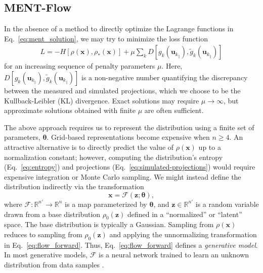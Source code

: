 \documentclass[%
    reprint,
    twocolumn,
    nofootinbib,
    amsmath,
    amssymb,
    aps,
    prstab,
]{revtex4-2}
\newcommand{\vect}[1]{\boldsymbol{\mathbf{#1}}}
\begin{document}
\subsection{MENT-Flow} \label{subsec:ment-flow}

In the absence of a method to directly optimize the Lagrange functions in Eq.~\eqref{eq:ment_solution}, we may try to minimize the loss function
%
\begin{multline}\label{eq:loss}
    L = 
    - H[\rho(\vect{x}), \rho_*(\vect{x})]
    +
    \mu \sum_{k} {
        D[
            {g}_k(\vect{u}_{k_\parallel}), 
            \tilde{g}_k(\vect{u}_{k_\parallel})
        ]
    }
\end{multline}
%
for an increasing sequence of penalty parameters $\mu$. Here, $D[{g}_k(\vect{u}_{k_\parallel}), \tilde{g}_k(\vect{u}_{k_\parallel})]$ is a non-negative number quantifying the discrepancy between the measured and simulated projections, which we choose to be the Kullback-Leibler (KL) divergence. Exact solutions may require $\mu \rightarrow \infty$, but approximate solutions obtained with finite $\mu$ are often sufficient. 

The above approach requires us to represent the distribution using a finite set of parameters, $\vect{\theta}$. Grid-based representations become expensive when $n \geq 4$. An attractive alternative is to directly predict the value of $\rho(\vect{x})$ up to a normalization constant; however, computing the distribution's entropy (Eq.~\eqref{eq:entropy}) and projections (Eq.~\eqref{eq:simulated-projections}) would require expensive integration or Monte Carlo sampling. We might instead define the distribution indirectly via the transformation
%
\begin{equation} \label{eq:flow_forward}
    \vect{x} = \mathcal{F}(\vect{z}; \vect{\theta}),
\end{equation}
%
where $\mathcal{F}: \mathbb{R}^{n'} \rightarrow \mathbb{R}^{n}$ is a map parameterized by $\vect{\theta}$, and $\mathbf{z} \in \mathbb{R}^{n'}$ is a random variable drawn from a base distribution $\rho_0(\vect{z})$ defined in a ``normalized'' or ``latent'' space. The base distribution is typically a Gaussian. Sampling from $\rho(\vect{x})$ reduces to sampling from $\rho_0(\vect{z})$ and applying the unnormalizing transformation in Eq.~\eqref{eq:flow_forward}. Thus, Eq.~\eqref{eq:flow_forward} defines a \textit{generative model}. In most generative models, $\mathcal{F}$ is a neural network trained to learn an unknown distribution from data samples \cite{Bond_2021}.
\end{document}
